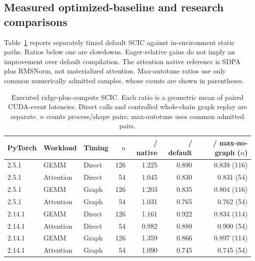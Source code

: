 \subsection{Measured optimized-baseline and research comparisons}

\label{sec:supplement-results}

Table~\ref{tab:supplement-selector} reports separately timed default SCIC against in-environment static paths. Ratios below one are slowdowns. Eager-relative gains do not imply an improvement over default compilation. The attention native reference is SDPA plus RMSNorm, not materialized attention. Max-autotune ratios use only common numerically admitted samples, whose counts are shown in parentheses.

\begin{table}[t]

\centering\small

\caption{Executed ridge-plus-compute SCIC. Each ratio is a geometric mean of paired CUDA-event latencies. Direct calls and controlled whole-chain graph replay are separate. $n$ counts process/shape pairs; max-autotune uses common admitted pairs.}

\label{tab:supplement-selector}

\begin{tabular}{@{}lllrrrr@{}}

\toprule

PyTorch & Workload & Timing & $n$ & / native & / default & / max-no-graph ($n$) \\

\midrule

2.5.1 & GEMM & Direct & 126 & 1.225 & 0.890 & 0.839 (116) \\

2.5.1 & Attention & Direct & 54 & 1.045 & 0.830 & 0.831 (54) \\

2.5.1 & GEMM & Graph & 126 & 1.203 & 0.835 & 0.804 (116) \\

2.5.1 & Attention & Graph & 54 & 1.031 & 0.765 & 0.762 (54) \\

2.14.1 & GEMM & Direct & 126 & 1.161 & 0.922 & 0.834 (114) \\

2.14.1 & Attention & Direct & 54 & 0.982 & 0.880 & 0.900 (54) \\

2.14.1 & GEMM & Graph & 126 & 1.359 & 0.866 & 0.897 (114) \\

2.14.1 & Attention & Graph & 54 & 1.090 & 0.745 & 0.745 (54) \\

\bottomrule

\end{tabular}

\end{table}

